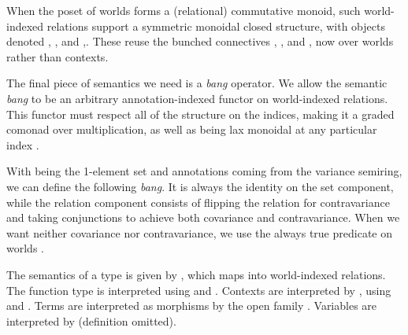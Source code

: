 
When the poset of worlds forms a (relational) commutative monoid, such
world-indexed relations support a symmetric monoidal closed structure, with
objects denoted ,
, and
,.
These reuse the bunched connectives , \AgdaRecord{$\sep$}, and
\AgdaRecord{$\wand$}, now over worlds rather than contexts.

The final piece of semantics we need is a \emph{bang} operator.
We allow the
semantic \emph{bang} to be an arbitrary annotation-indexed functor on
world-indexed relations.
This functor must respect all of the structure on the indices, making it a
graded comonad over multiplication, as well as being lax monoidal at any
particular index .


\begin{example}
  With  being the 1-element set and annotations coming from the
  variance semiring, we can define the following \emph{bang}.
  It is always the identity on the set component, while the relation component
  consists of flipping the relation for contravariance and taking conjunctions
  to achieve both covariance and contravariance.
  When we want neither covariance nor contravariance, we use the always true
  predicate on worlds .

\end{example}

%
%
%

The semantics of a type is given by \AgdaFunction{$\llbracket$\_$\rrbracket$},
which maps into world-indexed relations.
The function type is interpreted using  and
.
Contexts are interpreted by , using
 and .
Terms are interpreted as morphisms by the open family
\AgdaFunction{$\llbracket$\_$\vdash$\_$\rrbracket$}.
Variables are interpreted by  (definition omitted).

